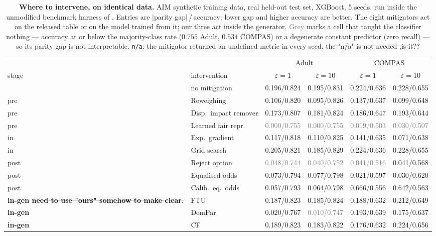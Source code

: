\begin{table}[t]
\centering\footnotesize
\caption{\textbf{Where to intervene, on identical data.} AIM synthetic training data, real held-out test set, XGBoost, 5 seeds, run inside the unmodified benchmark harness of \citet{angelozzi2026where}. Entries are $|$parity gap$|$\,/\,accuracy; lower gap and higher accuracy are better. The eight mitigators act on the released table or on the model trained from it; our three act inside the generator. \textcolor{gray}{Grey} marks a cell that taught the classifier nothing --- accuracy at or below the majority-class rate ($0.755$ Adult, $0.534$ COMPAS) or a degenerate constant predictor (zero recall) --- so its parity gap is not interpretable. \texttt{n/a}: the mitigator returned an undefined metric in every seed. \st{the "n/a" is not needed ,is it??}}
\label{tab:baselines}
\begin{tabular}{llcccc}
\toprule
 & & \multicolumn{2}{c}{Adult} & \multicolumn{2}{c}{COMPAS} \\
\cmidrule(lr){3-4}\cmidrule(lr){5-6}
stage & intervention & $\varepsilon{=}1$ & $\varepsilon{=}10$ & $\varepsilon{=}1$ & $\varepsilon{=}10$ \\
\midrule
 & no mitigation & 0.196/0.824 & 0.195/0.831 & 0.224/0.636 & 0.228/0.655 \\
\addlinespace[2pt]
pre & Reweighing & 0.106/0.820 & 0.095/0.826 & 0.137/0.637 & 0.099/0.648 \\
pre & Disp.\ impact remover & 0.173/0.807 & 0.181/0.824 & 0.186/0.647 & 0.193/0.644 \\
pre & Learned fair repr. & \textcolor{gray}{0.000/0.755} & \textcolor{gray}{0.000/0.755} & \textcolor{gray}{0.019/0.503} & \textcolor{gray}{0.030/0.507} \\
\addlinespace[2pt]
in & Exp.\ gradient & 0.117/0.818 & 0.110/0.825 & 0.141/0.635 & 0.071/0.638 \\
in & Grid search & 0.205/0.821 & 0.185/0.829 & 0.224/0.636 & 0.228/0.655 \\
\addlinespace[2pt]
post & Reject option & \textcolor{gray}{0.048/0.744} & \textcolor{gray}{0.040/0.752} & \textcolor{gray}{0.041/0.516} & 0.041/0.568 \\
post & Equalised odds & 0.073/0.794 & 0.077/0.798 & 0.021/0.597 & 0.030/0.620 \\
post & Calib.\ eq.\ odds & 0.057/0.793 & 0.064/0.798 & 0.666/0.556 & 0.642/0.563 \\
\addlinespace[2pt]
\textbf{in-gen \st{need to use "ours" somehow to make clear.}} & FTU & 0.187/0.823 & 0.185/0.824 & 0.188/0.632 & 0.212/0.649 \\
\textbf{in-gen} & DemPar & 0.020/0.767 & \textcolor{gray}{0.010/0.747} & 0.193/0.639 & 0.175/0.637 \\
\textbf{in-gen} & CF & 0.189/0.823 & 0.183/0.822 & 0.176/0.632 & 0.224/0.656 \\
\bottomrule
\end{tabular}
\end{table}
